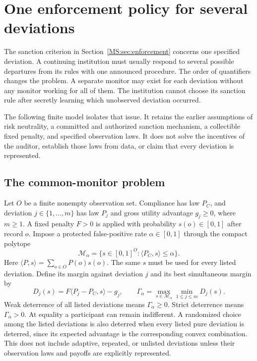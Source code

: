 \section{One enforcement policy for several deviations}\label{MS:sec:joint-enforcement}
The sanction criterion in Section~\ref{MS:sec:enforcement} concerns one specified deviation. A continuing institution must usually respond to several possible departures from its rules with one announced procedure. The order of quantifiers changes the problem. A separate monitor may exist for each deviation without any monitor working for all of them. The institution cannot choose its sanction rule after secretly learning which unobserved deviation occurred.

The following finite model isolates that issue. It retains the earlier assumptions of risk neutrality, a committed and authorized sanction mechanism, a collectible fixed penalty, and specified observation laws. It does not solve the incentives of the auditor, establish those laws from data, or claim that every deviation is represented.

\subsection{The common-monitor problem}
Let $O$ be a finite nonempty observation set. Compliance has law $P_C$, and deviation $j\in\{1,\ldots,m\}$ has law $P_j$ and gross utility advantage $g_j\geq0$, where $m\geq1$. A fixed penalty $F>0$ is applied with probability $s(o)\in[0,1]$ after record $o$. Impose a protected false-positive rate $\alpha\in[0,1]$ through the compact polytope
\[
\mathcal M_\alpha=\{s\in[0,1]^O:\langle P_C,s\rangle\leq\alpha\}.
\]
Here $\langle P,s\rangle=\sum_{o\in O}P(o)s(o)$. The same $s$ must be used for every listed deviation. Define its margin against deviation $j$ and its best simultaneous margin by
\begin{equation}\label{MS:eq:joint-margin}
D_j(s)=F\langle P_j-P_C,s\rangle-g_j,
\qquad
\Gamma_\alpha=\max_{s\in\mathcal M_\alpha}\min_{1\leq j\leq m}D_j(s).
\end{equation}
Weak deterrence of all listed deviations means $\Gamma_\alpha\geq0$. Strict deterrence means $\Gamma_\alpha>0$. At equality a participant can remain indifferent. A randomized choice among the listed deviations is also deterred when every listed pure deviation is deterred, since its expected advantage is the corresponding convex combination. This does not include adaptive, repeated, or unlisted deviations unless their observation laws and payoffs are explicitly represented.

